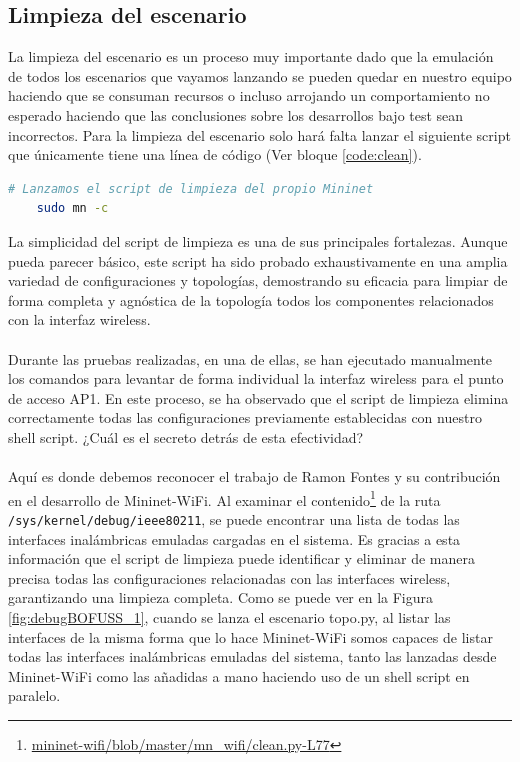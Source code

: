 \subsection{Limpieza del escenario}

La limpieza del escenario es un proceso muy importante dado que la emulación de todos los escenarios que vayamos lanzando se pueden quedar en nuestro equipo haciendo que se consuman recursos o incluso arrojando un comportamiento no esperado haciendo que las conclusiones sobre los desarrollos bajo test sean incorrectos. Para la limpieza del escenario solo hará falta lanzar el siguiente script que únicamente tiene una línea de código (Ver bloque \ref{code:clean}).\\

\begin{lstlisting}[language= bash, style=Consola, caption={Script de limpieza del escenario - clean.sh},label=code:clean]
    # Lanzamos el script de limpieza del propio Mininet
    sudo mn -c
\end{lstlisting}
\vspace{0.5cm}


La simplicidad del script de limpieza es una de sus principales fortalezas. Aunque pueda parecer básico, este script ha sido probado exhaustivamente en una amplia variedad de configuraciones y topologías, demostrando su eficacia para limpiar de forma completa y agnóstica de la topología todos los componentes relacionados con la interfaz wireless.\\
\\
Durante las pruebas realizadas, en una de ellas, se han ejecutado manualmente los comandos para levantar de forma individual la interfaz wireless para el punto de acceso AP1. En este proceso, se ha observado que el script de limpieza elimina correctamente todas las configuraciones previamente establecidas con nuestro shell script. ¿Cuál es el secreto detrás de esta efectividad?\\
\\
Aquí es donde debemos reconocer el trabajo de Ramon Fontes y su contribución en el desarrollo de Mininet-WiFi. Al examinar el contenido\footnote{\href{https://github.com/intrig-unicamp/mininet-wifi/blob/master/mn_wifi/clean.py\#L77}{mininet-wifi/blob/master/mn\_wifi/clean.py-L77}} de la ruta \texttt{/sys/kernel/debug/ieee80211}, se puede encontrar una lista de todas las interfaces inalámbricas emuladas cargadas en el sistema. Es gracias a esta información que el script de limpieza puede identificar y eliminar de manera precisa todas las configuraciones relacionadas con las interfaces wireless, garantizando una limpieza completa. Como se puede ver en la Figura \ref{fig:debugBOFUSS_1}, cuando se lanza el escenario topo.py, al listar las interfaces de la misma forma que lo hace Mininet-WiFi somos capaces de listar todas las interfaces inalámbricas emuladas del sistema, tanto las lanzadas desde Mininet-WiFi como las añadidas a mano haciendo uso de un shell script en paralelo.


